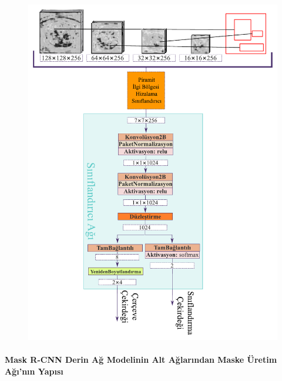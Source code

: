 \begin{figure}[h!]
	\begin{center}
		\vspace{0.4cm}
		{
			\vspace{0.4cm}
			\includegraphics[scale=0.88]{Yapilan-Calismalar/Figures/classifier_network.pdf}
		}
	\end{center}
\end{figure}

\paragraph{Mask R-CNN Derin Ağ Modelinin Alt Ağlarından Maske Üretim Ağı'nın Yapısı}

